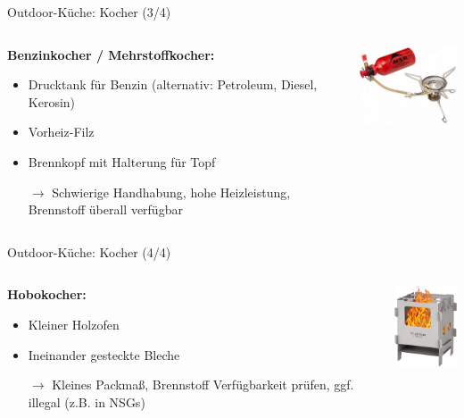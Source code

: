 \documentclass{beamer}
\newcommand{\sarrow}{\small$\rightarrow$}
\begin{document}
			\begin{frame}{Outdoor-Küche: Kocher (3/4)}
				\begin{columns}[c]
					\begin{column}{0.62\textwidth}
						\textbf{Benzinkocher / Mehrstoffkocher:}
						\begin{itemize}
							\item Drucktank für Benzin (alternativ: Petroleum, Diesel, Kerosin)
							\item Vorheiz-Filz
							\item Brennkopf mit Halterung für Topf
							\item[\sarrow] Schwierige Handhabung, hohe Heizleistung, Brennstoff überall verfügbar
						\end{itemize}
					\end{column}
					\begin{column}{0.36\textwidth}
						\includegraphics[width=3.85cm]{images/kocher-benzin.png}
					\end{column}
				\end{columns}
			\end{frame}
		
			\begin{frame}{Outdoor-Küche: Kocher (4/4)}
				\begin{columns}[c]
					\begin{column}{0.69\textwidth}
						\textbf{Hobokocher:}
						\begin{itemize}
							\item Kleiner Holzofen
							\item Ineinander gesteckte Bleche
							\item[\sarrow] Kleines Packmaß, Brennstoff Verfügbarkeit prüfen, ggf. illegal (z.B. in NSGs) 
						\end{itemize}
					\end{column}
					\begin{column}{0.29\textwidth}
						\includegraphics[width=2.35cm]{images/kocher-hobo.png}
					\end{column}
				\end{columns}
			\end{frame}
			
\end{document}
